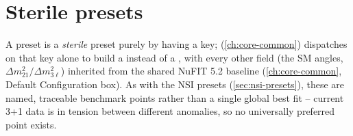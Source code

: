 \section{Sterile presets}
\label{sec:sterile-presets}


\begin{implbox}
A preset is a \emph{sterile} preset purely by having a 
key; 
(\cref{ch:core-common}) dispatches on that key alone to build a
 instead of a , with every other
field (the SM angles, $\Delta m^2_{21}/\Delta m^2_{3\ell}$) inherited from
the shared NuFIT 5.2 baseline (\cref{ch:core-common}, Default Configuration
box). As with the NSI presets (\cref{sec:nsi-presets}), these are named,
traceable benchmark points rather than a single global best fit -- current
3+1 data is in tension between different anomalies, so no universally
preferred point exists.


\end{implbox}
